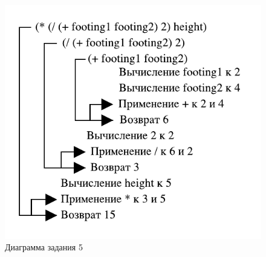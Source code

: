 \begin{figure}[H]
    \centering
    \includegraphics{img/05.pdf}
    \caption{Диаграмма задания 5}
\end{figure}
